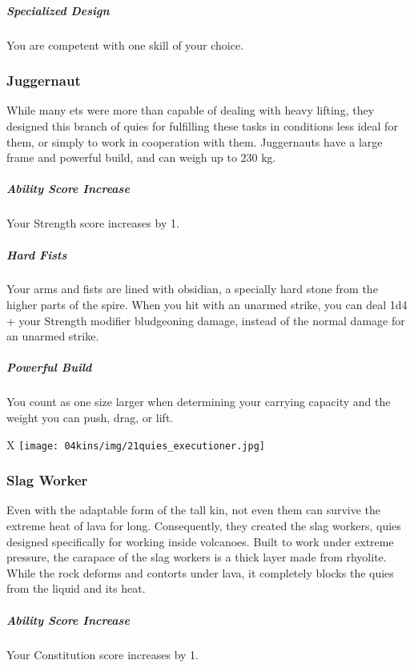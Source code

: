 \subparagraph{Specialized Design} You are competent with one skill of your choice.

\subsubsection{Juggernaut}
While many ets were more than capable of dealing with heavy lifting, they designed this branch of quies for fulfilling these tasks in conditions less ideal for them, or simply to work in cooperation with them.
Juggernauts have a large frame and powerful build, and can weigh up to 230 kg.

\subparagraph{Ability Score Increase} Your Strength score increases by 1.

\subparagraph{Hard Fists} Your arms and fists are lined with obsidian, a specially hard stone from the higher parts of the spire.
When you hit with an unarmed strike, you can deal 1d4 + your Strength modifier bludgeoning damage, instead of the normal damage for an unarmed strike.

\subparagraph{Powerful Build} You count as one size larger when determining your carrying capacity and the weight you can push, drag, or lift.

\begin{table*}[b]%
    \begin{DndTable}[width=\linewidth]{X}
        \texttt{[image: 04kins/img/21quies\_executioner.jpg]}
    \end{DndTable}
\end{table*}

\subsubsection{Slag Worker}
Even with the adaptable form of the tall kin, not even them can survive the extreme heat of lava for long.
Consequently, they created the slag workers, quies designed specifically for working inside volcanoes.
Built to work under extreme pressure, the carapace of the slag workers is a thick layer made from rhyolite.
While the rock deforms and contorts under lava, it completely blocks the quies from the liquid and its heat.

\subparagraph{Ability Score Increase} Your Constitution score increases by 1.

